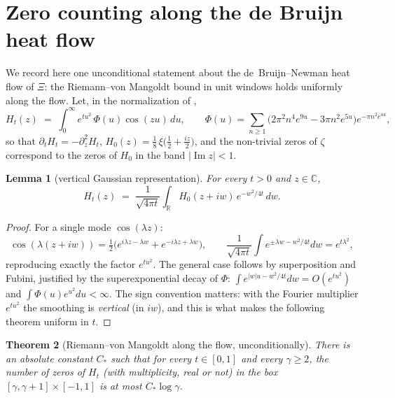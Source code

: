 \documentclass[11pt]{amsart}
\theoremstyle{plain}
\newtheorem{theorem}{Theorem}[section]
\newtheorem{lemma}[theorem]{Lemma}
\theoremstyle{definition}
\theoremstyle{remark}
\newcommand{\Imm}{\operatorname{Im}}
\begin{document}
\section{Zero counting along the de Bruijn heat flow}\label{sec:rvmt}

We record here one unconditional statement about the de~Bruijn--Newman heat flow of $\Xi$: the Riemann--von Mangoldt bound in unit windows holds uniformly along the flow. Let, in the normalization of \cite{Polymath2019},
\[
H_t(z)\;=\;\int_0^\infty e^{tu^2}\,\Phi(u)\cos(zu)\,du,
\qquad
\Phi(u)=\sum_{n\ge1}\bigl(2\pi^2n^4e^{9u}-3\pi n^2e^{5u}\bigr)e^{-\pi n^2e^{4u}},
\]
so that $\partial_tH_t=-\partial_z^2H_t$, $H_0(z)=\tfrac18\,\xi\bigl(\tfrac12+\tfrac{iz}2\bigr)$, and the non-trivial zeros of $\zeta$ correspond to the zeros of $H_0$ in the band $|\Imm z|<1$.

\begin{lemma}[vertical Gaussian representation]\label{lem:vertical}
For every $t>0$ and $z\in\mathbb C$,
\[
H_t(z)\;=\;\frac1{\sqrt{4\pi t}}\int_{\mathbb R}H_0(z+iw)\,e^{-w^2/4t}\,dw .
\]
\end{lemma}

\begin{proof}
For a single mode $\cos(\lambda z)$:
\[
\cos(\lambda(z+iw))=\tfrac12\bigl(e^{i\lambda z-\lambda w}+e^{-i\lambda z+\lambda w}\bigr),\qquad \frac1{\sqrt{4\pi t}}\int e^{\pm\lambda w-w^2/4t}dw=e^{t\lambda^2},
\] reproducing exactly the factor $e^{tu^2}$. The general case follows by superposition and Fubini, justified by the superexponential decay of $\Phi$: $\int e^{|w|u-w^2/4t}dw=O(e^{tu^2})$ and $\int\Phi(u)e^{u^2}du<\infty$. The sign convention matters: with the Fourier multiplier $e^{tu^2}$ the smoothing is \emph{vertical} (in $iw$), and this is what makes the following theorem uniform in $t$.
\end{proof}

\begin{theorem}[Riemann--von Mangoldt along the flow, unconditionally]\label{thm:rvmt}
There is an absolute constant $C_\ast$ such that for every $t\in[0,1]$ and every $\gamma\ge2$, the number of zeros of $H_t$ \textup{(}with multiplicity, real or not\textup{)} in the box $[\gamma,\gamma+1]\times[-1,1]$ is at most $C_\ast\log\gamma$.
\end{theorem}
\end{document}

